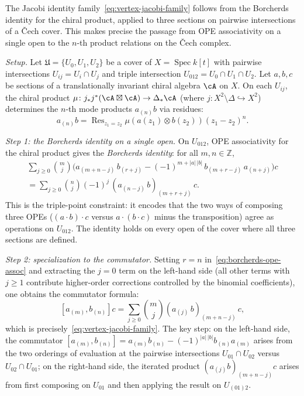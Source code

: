 \begin{remark}
\label{rem:jacobi-family-derivation}
The Jacobi identity family~\eqref{eq:vertex-jacobi-family} follows
from the Borcherds
identity for the chiral product, applied to three sections on
pairwise intersections of a \v{C}ech cover. This makes precise
the passage from OPE associativity on a single open to the $n$-th
product relations on the \v{C}ech complex.

\smallskip\noindent\emph{Setup.}
Let $\mathfrak{U} = \{U_0, U_1, U_2\}$ be a cover of
$X = \operatorname{Spec}k[t]$ with pairwise intersections
$U_{ij} = U_i \cap U_j$ and triple intersection
$U_{012} = U_0 \cap U_1 \cap U_2$. Let $a,b,c$ be sections of a
translationally invariant chiral algebra $\cA$ on $X$. On each
$U_{ij}$, the chiral product
$\mu\colon j_*j^*(\cA \boxtimes \cA) \to \Delta_*\cA$
(where $j\colon X^2 \setminus \Delta \hookrightarrow X^2$)
determines the $n$-th mode products $a_{(n)}b$ via residues:
\[
a_{(n)}b = \operatorname{Res}_{z_1 = z_2}
 \mu(a(z_1) \otimes b(z_2))(z_1 - z_2)^n.
\]

\smallskip\noindent\emph{Step 1: the Borcherds identity on a
 single open.}
On $U_{012}$, OPE associativity for the chiral product gives the
\emph{Borcherds identity}: for all $m,n \in \mathbb{Z}$,
\begin{multline}\label{eq:borcherds-ope-assoc}
\sum_{j \geq 0}\binom{m}{j}
\bigl(a_{(m+n-j)}\,b_{(r+j)} - (-1)^{m+|a|\,|b|}\,
 b_{(m+r-j)}\,a_{(n+j)}\bigr)c \\
= \sum_{j \geq 0}\binom{n}{j}
 (-1)^j\,(a_{(n-j)}\,b)_{(m+r+j)}\,c.
\end{multline}
This is the triple-point constraint: it encodes that the two ways
of composing three OPEs ($(a \cdot b) \cdot c$ versus
$a \cdot (b \cdot c)$ minus the transposition) agree as
operations on $U_{012}$. The identity holds on every open of the
cover where all three sections are defined.

\smallskip\noindent\emph{Step 2: specialization to the commutator.}
Setting $r = n$ in~\eqref{eq:borcherds-ope-assoc} and extracting
the $j = 0$ term on the left-hand side (all other terms with
$j \geq 1$ contribute higher-order corrections controlled by the
binomial coefficients), one obtains the commutator formula:
\begin{equation}\label{eq:jacobi-from-borcherds}
[a_{(m)}, b_{(n)}]c
= \sum_{j \geq 0}\binom{m}{j}(a_{(j)}\,b)_{(m+n-j)}\,c,
\end{equation}
which is precisely~\eqref{eq:vertex-jacobi-family}. The key
step: on the left-hand side, the commutator
$[a_{(m)}, b_{(n)}] = a_{(m)} b_{(n)} - (-1)^{|a|\,|b|}
b_{(n)} a_{(m)}$ arises from the two orderings of evaluation
at the pairwise intersections $U_{01} \cap U_{02}$ versus
$U_{02} \cap U_{01}$; on the right-hand side, the iterated
product $(a_{(j)}b)_{(m+n-j)}c$ arises from first composing on
$U_{01}$ and then applying the result on $U_{(01)2}$.


\end{remark}
